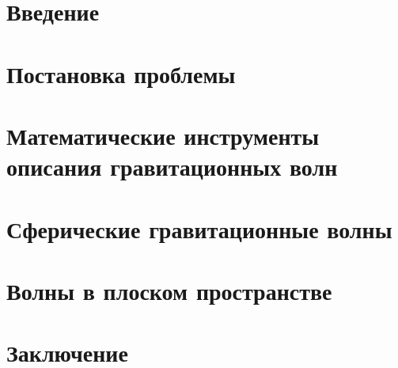 \documentclass[12pt,a4paper,final]{article}
\providecommand{\docroot}{../..}
\numberwithin{equation}{section}
\begin{document}
    \makedocroot

    
    \tableofcontents

    \newpage

    \section{Введение}
    

    \section{Постановка проблемы}
    

    \section{Математические инструменты описания гравитационных волн}
    

    \section{Сферические гравитационные волны}\label{sec:grav-spher}
    

    \section{Волны в плоском пространстве}
    
    

    \section{Заключение}
    

    \clearpage

    
    
\end{document}
